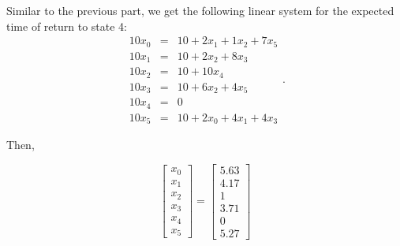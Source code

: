 Similar to the previous part, we get the following linear system for the expected time of return to state 4:
\[ \begin{array}{rcl}
    10 x_0 & = & 10 + 2x_1 + 1x_2 + 7 x_5\\
    10 x_1 & = & 10 + 2 x_2 + 8 x_3\\
    10 x_2 & = & 10 + 10 x_4\\
    10 x_3 & = & 10 + 6 x_2 + 4 x_5\\
    10 x_4 & = & 0\\
    10 x_5 & = & 10 + 2x_0 + 4x_1 + 4x_3
\end{array}. \]

Then,

\[ \left[ \begin{array}{c}
    x_0\\
    x_1\\
    x_2\\
    x_3\\
    x_4\\
    x_5
\end{array} \right]
= 
\left[ \begin{array}{c}
    5.63\\
    4.17\\
    1        \\
    3.71\\
    0       \\
    5.27
\end{array} \right] \]
